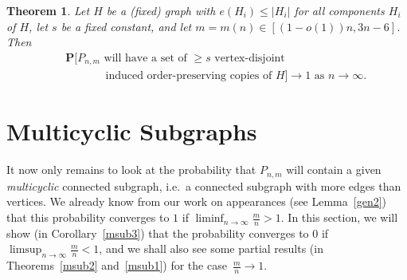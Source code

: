 \documentclass{article}
\newtheorem{Theorem}{Theorem}
\newtheorem{Proof of Theorem}{Proof of Theorem}
\begin{document}
\begin{Theorem} \label{unisub3}
Let $H$ be a (fixed) graph with $e(H_{i}) \leq |H_{i}|$ for all components $H_{i}$ of $H$,
let $s$ be a fixed constant,
and let $m=m(n) \in [(1-o(1))n, 3n-6]$.
Then 
\begin{eqnarray*}
& & \mathbf{P}\Big[\textrm{$P_{n,m}$ 
will have a set of $\geq s$ vertex-disjoint} \\
& & \phantom{wwwww}\textrm{induced order-preserving copies of $H$}\Big] 
\to 1
\textrm{ as } n \to \infty.
\end{eqnarray*} 
\end{Theorem}













































\newpage
\section{Multicyclic Subgraphs} \label{multsub}















It now only remains to
look at the probability that $P_{n,m}$ will contain a given \textit{multicyclic} connected subgraph,
i.e.~a connected subgraph with more edges than vertices.
We already know from our work on appearances
(see Lemma~\ref{gen2}) that this probability converges to $1$ 
if $\liminf_{n \to \infty} \frac{m}{n} > 1$.
In this section,
we will show (in Corollary~\ref{msub3})
that the probability converges to $0$ if $\limsup_{n \to \infty} \frac{m}{n} < 1$,
and we shall also see some partial results
(in Theorems~\ref{msub2} and~\ref{msub1})
for the case~$\frac{m}{n} \to 1$.
\end{document}
